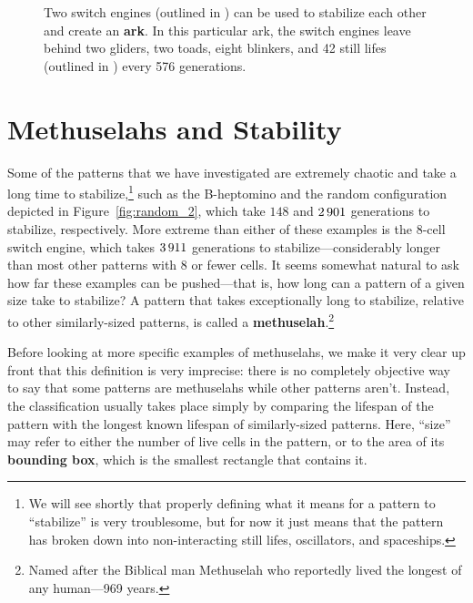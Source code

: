 \begin{figure}[!htb]
	\centering{}
	\caption{Two switch engines (outlined in ) can be used to stabilize each other and create an \textbf{ark}. In this particular ark, the switch engines leave behind two gliders, two toads, eight blinkers, and 42 still lifes (outlined in ) every 576 generations.}\label{fig:ark_1}
\end{figure}


\section{Methuselahs and Stability}\label{sec:methuselah}

Some of the patterns that we have investigated are extremely chaotic and take a long time to stabilize,\footnote{We will see shortly that properly defining what it means for a pattern to ``stabilize'' is very troublesome, but for now it just means that the pattern has broken down into non-interacting still lifes, oscillators, and spaceships.} such as the B-heptomino and the random configuration depicted in Figure~\ref{fig:random_2}, which take $148$ and $2{\,}901$ generations to stabilize, respectively. More extreme than either of these examples is the $8$-cell switch engine, which takes $3{\,}911$ generations to stabilize---considerably longer than most other patterns with $8$ or fewer cells. It seems somewhat natural to ask how far these examples can be pushed---that is, how long can a pattern of a given size take to stabilize? A pattern that takes exceptionally long to stabilize, relative to other similarly-sized patterns, is called a \textbf{methuselah}.\footnote{Named after the Biblical man Methuselah who reportedly lived the longest of any human---969 years.}

Before looking at more specific examples of methuselahs, we make it very clear up front that this definition is very imprecise: there is no completely objective way to say that some patterns are methuselahs while other patterns aren't. Instead, the classification usually takes place simply by comparing the lifespan of the pattern with the longest known lifespan of similarly-sized patterns. Here, ``size'' may refer to either the number of live cells in the pattern, or to the area of its \textbf{bounding box}, which is the smallest rectangle that contains it.

